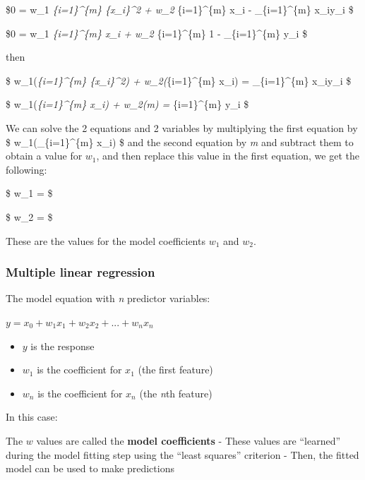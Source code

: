 \documentclass[11pt]{article}
\providecommand{\tightlist}{%
      \setlength{\itemsep}{0pt}\setlength{\parskip}{0pt}}
\begin{document}
\$0 = w\_1 \sum\emph{\{i=1\}\^{}\{m\} \{x\_i\}\^{}2 + w\_2
\sum}\{i=1\}\^{}\{m\} x\_i - \sum\_\{i=1\}\^{}\{m\} x\_iy\_i \$

\$0 = w\_1 \sum\emph{\{i=1\}\^{}\{m\} x\_i + w\_2 \sum}\{i=1\}\^{}\{m\}
1 - \sum\_\{i=1\}\^{}\{m\} y\_i \$

then

\$ w\_1(\sum\emph{\{i=1\}\^{}\{m\} \{x\_i\}\^{}2) +
w\_2(\sum}\{i=1\}\^{}\{m\} x\_i) = \sum\_\{i=1\}\^{}\{m\} x\_iy\_i \$

\$ w\_1(\sum\emph{\{i=1\}\^{}\{m\} x\_i) + w\_2(m) =
\sum}\{i=1\}\^{}\{m\} y\_i \$

We can solve the 2 equations and 2 variables by multiplying the first
equation by \$ w\_1(\sum\_\{i=1\}\^{}\{m\} x\_i) \$ and the second
equation by \emph{m} and subtract them to obtain a value for \(w_1\),
and then replace this value in the first equation, we get the following:

\$ w\_1 =
\$

\$ w\_2 =
\$

These are the values for the model coefficients \(w_1\) and \(w_2\).

    \hypertarget{multiple-linear-regression}{%
\subsubsection{Multiple linear
regression}\label{multiple-linear-regression}}

The model equation with \emph{n} predictor variables:

\(y = x_0 + w_1x_1 + w_2x_2 + ... + w_{n}x_{n}\)

\begin{itemize}
\tightlist
\item
  \(y\) is the response
\item
  \(w_1\) is the coefficient for \(x_1\) (the first feature)
\item
  \(w_n\) is the coefficient for \(x_n\) (the \emph{n}th feature)
\end{itemize}

In this case:

The \(w\) values are called the \textbf{model coefficients} - These
values are ``learned'' during the model fitting step using the ``least
squares'' criterion - Then, the fitted model can be used to make
predictions
\end{document}
